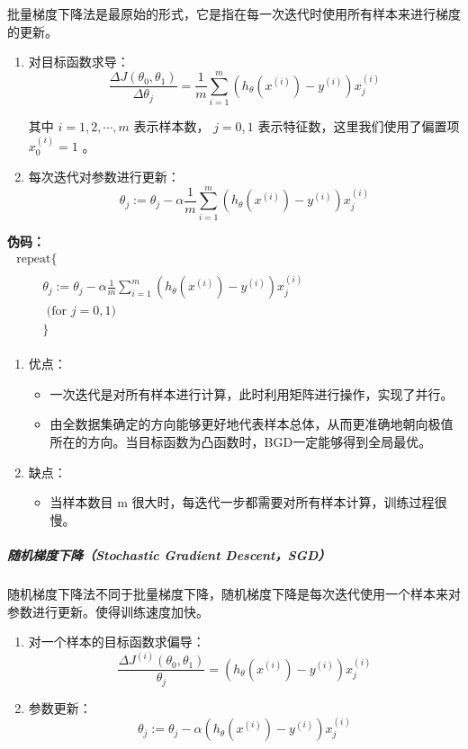 批量梯度下降法是最原始的形式，它是指在每一次迭代时使用所有样本来进行梯度的更新。
\begin{enumerate}
  \item 对目标函数求导：$$\frac{\Delta J\left(\theta_{0}, \theta_{1}\right)}{\Delta \theta_{j}}=\frac{1}{m} \sum_{i=1}^{m}\left(h_{\theta}\left(x^{(i)}\right)-y^{(i)}\right) x_{j}^{(i)}$$

其中 $i=1,2,\cdots,m$ 表示样本数， $j=0,1$ 表示特征数，这里我们使用了偏置项 $x_0^{(i)}=1$ 。
  \item 每次迭代对参数进行更新： $$\theta_{j}:=\theta_{j}-\alpha \frac{1}{m} \sum_{i=1}^{m}\left(h_{\theta}\left(x^{(i)}\right)-y^{(i)}\right) x_{j}^{(i)}$$
\end{enumerate}

\noindent \textbf{伪码：}\\
$\begin{array}{l}{\text { repeat\{ }} \\ {\qquad \begin{array}{l}{\theta_{j}:=\theta_{j}-\alpha \frac{1}{m} \sum_{i=1}^{m}\left(h_{\theta}\left(x^{(i)}\right)-y^{(i)}\right) x_{j}^{(i)}} \\ { \text { (for }j=0,1)} \\ \} \end{array}}\end{array}$


\begin{enumerate}
  \item 优点：
\begin{itemize}
  \item 一次迭代是对所有样本进行计算，此时利用矩阵进行操作，实现了并行。
  \item 由全数据集确定的方向能够更好地代表样本总体，从而更准确地朝向极值所在的方向。当目标函数为凸函数时，BGD一定能够得到全局最优。
\end{itemize}
  \item 缺点：
\begin{itemize}
  \item 当样本数目 m 很大时，每迭代一步都需要对所有样本计算，训练过程很慢。
\end{itemize}
\end{enumerate}

\subparagraph{随机梯度下降（Stochastic Gradient Descent，SGD）}

随机梯度下降法不同于批量梯度下降，随机梯度下降是每次迭代使用一个样本来对参数进行更新。使得训练速度加快。

\begin{enumerate}
  \item 对一个样本的目标函数求偏导：
        $$\frac{\Delta J^{(i)}\left(\theta_{0}, \theta_{1}\right)}{\theta_{j}}=\left(h_{\theta}\left(x^{(i)}\right)-y^{(i)}\right) x_{j}^{(i)}$$
  \item 参数更新：
$$\theta_{j}:=\theta_{j}-\alpha\left(h_{\theta}\left(x^{(i)}\right)-y^{(i)}\right) x_{j}^{(i)}$$
\end{enumerate}

